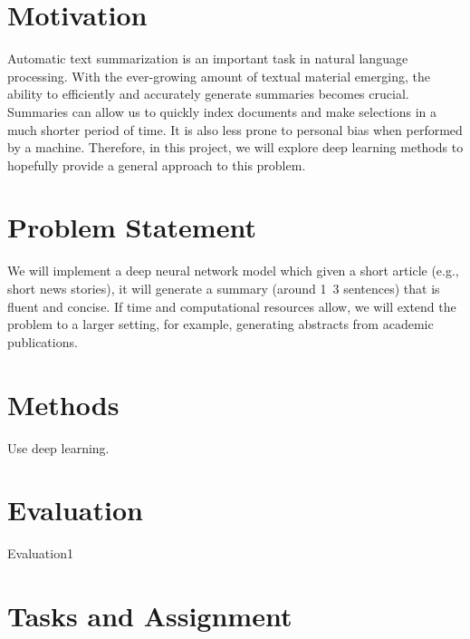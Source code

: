 \section{Motivation}
Automatic text summarization is an important task in natural language processing. With the ever-growing amount of textual material emerging, the ability to efficiently and accurately generate summaries becomes crucial. Summaries can allow us to quickly index documents and make selections in a much shorter period of time. It is also less prone to personal bias when performed by a machine. Therefore, in this project, we will explore deep learning methods to hopefully provide a general approach to this problem.

\section{Problem Statement}
We will implement a deep neural network model which given a short article (e.g., short news stories), it will generate a summary (around 1~3 sentences) that is fluent and concise. If time and computational resources allow, we will extend the problem to a larger setting, for example, generating abstracts from academic publications. 



\section{Methods}
\begin{compactitem}
\item Use deep learning. 
\end{compactitem}



\section{Evaluation}
\begin{compactitem}
\item Evaluation1
\end{compactitem}

\section{Tasks and Assignment}

